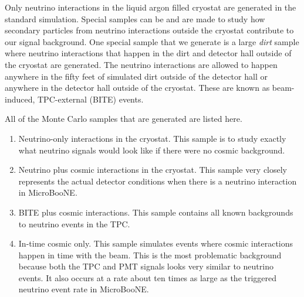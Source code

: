     Only neutrino interactions in the liquid argon filled cryostat are
    generated in the standard simulation. Special samples can be and are made
    to study how secondary particles from neutrino interactions outside the
    cryostat contribute to our signal background. One special sample that we
    generate is a large \textit{dirt} sample where neutrino interactions that
    happen in the dirt and detector hall outside of the cryostat are generated.
    The neutrino interactions are allowed to happen anywhere in the fifty feet
    of simulated dirt outside of the detector hall or anywhere in the detector
    hall outside of the cryostat. These are known as beam-induced, TPC-external
    (BITE) events.

    All of the Monte Carlo samples that are generated are listed here.
    \begin{enumerate}
      \item Neutrino-only interactions in the cryostat. This sample is to study
      exactly what neutrino signals would look like if there were no cosmic
      background.
      \item Neutrino plus cosmic interactions in the cryostat. This sample
      very closely represents the actual detector conditions when there is a
      neutrino interaction in MicroBooNE.
      \item BITE plus cosmic interactions. This sample contains all known
      backgrounds to neutrino events in the TPC.
      \item In-time cosmic only. This sample simulates events where cosmic
      interactions happen in time with the beam. This is the most problematic
      background because both the TPC and PMT signals looks very similar to
      neutrino events. It also occurs at a rate about ten times as large as the
      triggered neutrino event rate in MicroBooNE.
    \end{enumerate}

